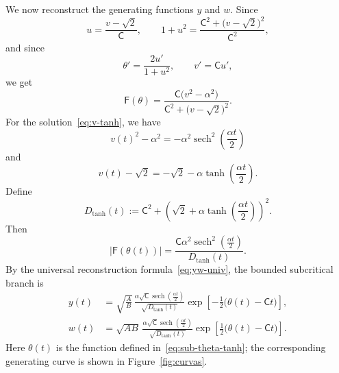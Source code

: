 \documentclass[11pt,a4paper]{amsart}
\theoremstyle{plain}
\theoremstyle{remark}
\newcommand{\C}{\mathsf{C}}
\newcommand{\F}{\mathsf{F}}
\DeclareMathOperator{\sech}{sech}
\begin{document}
We now reconstruct the generating functions $y$ and $w$. Since
\[
u=\frac{v-\sqrt{2}}{\C},
\qquad
1+u^{2}
=
\frac{\C^{2}+\bigl(v-\sqrt{2}\bigr)^{2}}{\C^{2}},
\]
and since
\[
\theta'=\frac{2u'}{1+u^{2}},
\qquad
v'=\C u',
\]
we get
\begin{equation}\label{eq:F-in-v}
\F(\theta)
=
\frac{
\C\bigl(v^{2}-\alpha^{2}\bigr)
}
{
\C^{2}+\bigl(v-\sqrt{2}\bigr)^{2}
}.
\end{equation}
For the solution~\eqref{eq:v-tanh}, we have
\[
v(t)^{2}-\alpha^{2}
=
-\alpha^{2}\sech^{2}\left(\frac{\alpha t}{2}\right)
\]
and
\[
v(t)-\sqrt{2}
=
-\sqrt{2}
-
\alpha
\tanh\left(\frac{\alpha t}{2}\right).
\]
Define
\begin{equation}\label{eq:D-tanh}
D_{\mathrm{tanh}}(t)
:=
\C^{2}
+
\left(
\sqrt{2}
+
\alpha
\tanh\left(\frac{\alpha t}{2}\right)
\right)^{2}.
\end{equation}
Then
\begin{equation}\label{eq:sub-F-tanh}
|\F(\theta(t))|
=
\frac{
\C\alpha^{2}\sech^{2}\left(\frac{\alpha t}{2}\right)
}
{
D_{\mathrm{tanh}}(t)
}.
\end{equation}
By the universal reconstruction formula~\eqref{eq:yw-univ}, the bounded
subcritical branch is
\begin{equation}\label{eq:sub-yw-tanh}
\boxed{\;
\begin{aligned}
y(t)
&=
\sqrt{\frac{A}{B}}\,
\frac{
\alpha\sqrt{\C}
\sech\left(\frac{\alpha t}{2}\right)}
{
\sqrt{D_{\mathrm{tanh}}(t)}
}
\exp\left[
-\frac{1}{2}\bigl(\theta(t)-\C t\bigr)
\right],
\\[2pt]
w(t)
&=
\sqrt{AB}\,
\frac{
\alpha\sqrt{\C}
\sech\left(\frac{\alpha t}{2}\right)}
{
\sqrt{D_{\mathrm{tanh}}(t)}
}
\exp\left[
\frac{1}{2}\bigl(\theta(t)-\C t\bigr)
\right].
\end{aligned}
\;}
\end{equation}
Here $\theta(t)$ is the function defined in~\eqref{eq:sub-theta-tanh};
the corresponding generating curve is shown in Figure~\ref{fig:curvas}.
\end{document}
